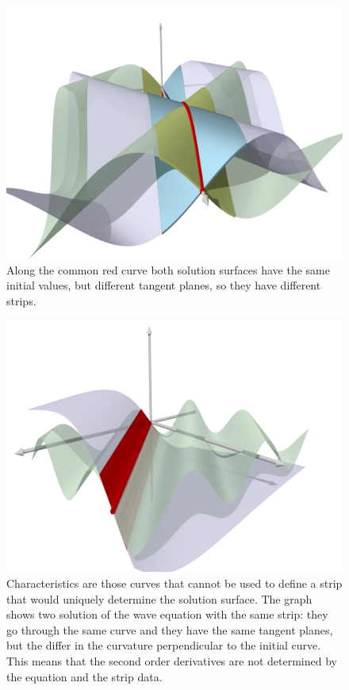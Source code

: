 \begin{figure}
\centering
\includegraphics[width=\hsize]{../common/3d/streifen2.png}
\caption{Along the common red curve both solution surfaces have
the same initial values, but different tangent planes, so they
have different strips.
\label{skript:streifen:eindeutig}}
\end{figure}

\begin{figure}
\centering
\includegraphics[width=\hsize]{../common/3d/streifen1.png}
\caption{Characteristics are those curves that cannot be used to
define a strip that would uniquely determine the solution surface.
The graph shows two solution of the wave equation with the same
strip: they go through the same curve and they have the same
tangent planes, but the differ in the curvature perpendicular to the
initial curve.
This means that the second order derivatives are not determined by
the equation and the strip data.
\label{skript:streifen:zweideutig}}
\end{figure}


